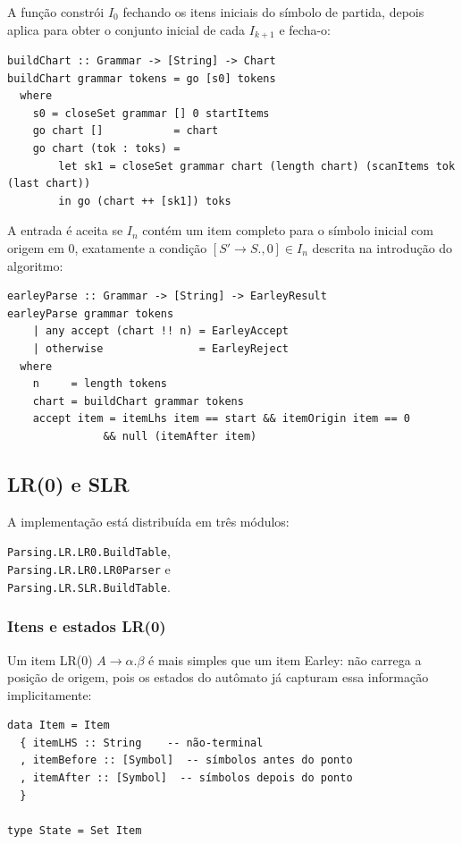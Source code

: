 A função  constrói \(I_0\)
fechando os itens iniciais do símbolo de partida, depois aplica
 para obter o conjunto inicial de
cada \(I_{k+1}\) e fecha-o:

\begin{verbatim}
buildChart :: Grammar -> [String] -> Chart
buildChart grammar tokens = go [s0] tokens
  where
    s0 = closeSet grammar [] 0 startItems
    go chart []           = chart
    go chart (tok : toks) =
        let sk1 = closeSet grammar chart (length chart) (scanItems tok (last chart))
        in go (chart ++ [sk1]) toks
\end{verbatim}

A entrada é aceita se \(I_n\) contém um item completo para o símbolo
inicial com origem em 0, exatamente a condição \([S' \to S., 0]
\in I_n\) descrita na introdução do algoritmo:

\begin{verbatim}
earleyParse :: Grammar -> [String] -> EarleyResult
earleyParse grammar tokens
    | any accept (chart !! n) = EarleyAccept
    | otherwise               = EarleyReject
  where
    n     = length tokens
    chart = buildChart grammar tokens
    accept item = itemLhs item == start && itemOrigin item == 0
               && null (itemAfter item)
\end{verbatim}

\subsection{LR(0) e SLR}

A implementação está distribuída em três módulos:
\begin{flushleft}
  \verb|Parsing.LR.LR0.BuildTable|,\\
  \verb|Parsing.LR.LR0.LR0Parser| e\\
  \verb|Parsing.LR.SLR.BuildTable|.
\end{flushleft}

\subsubsection{Itens e estados LR(0)}

Um item LR(0) \(A \to \alpha . \beta\) é mais simples que um item
Earley: não carrega a posição de origem, pois os estados do autômato
já capturam essa informação implicitamente:

\begin{verbatim}
data Item = Item
  { itemLHS :: String    -- não-terminal
  , itemBefore :: [Symbol]  -- símbolos antes do ponto
  , itemAfter :: [Symbol]  -- símbolos depois do ponto
  }

type State = Set Item
\end{verbatim}

